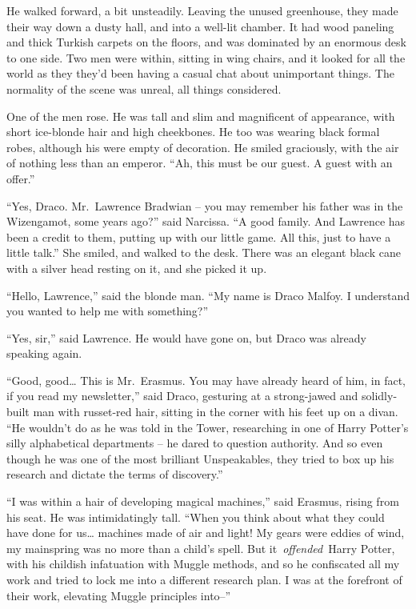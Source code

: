 He walked forward, a bit unsteadily. Leaving the unused greenhouse, they
made their way down a dusty hall, and into a well-lit chamber. It had
wood paneling and thick Turkish carpets on the floors, and was dominated
by an enormous desk to one side. Two men were within, sitting in wing
chairs, and it looked for all the world as they they'd been having a
casual chat about unimportant things. The normality of the scene was
unreal, all things considered.

One of the men rose. He was tall and slim and magnificent of appearance,
with short ice-blonde hair and high cheekbones. He too was wearing black
formal robes, although his were empty of decoration. He smiled
graciously, with the air of nothing less than an emperor. ``Ah, this
must be our guest. A guest with an offer.''

``Yes, Draco. Mr.~Lawrence Bradwian -- you may remember his father was
in the Wizengamot, some years ago?'' said Narcissa. ``A good family. And
Lawrence has been a credit to them, putting up with our little game. All
this, just to have a little talk.'' She smiled, and walked to the desk.
There was an elegant black cane with a silver head resting on it, and
she picked it up.

``Hello, Lawrence,'' said the blonde man. ``My name is Draco Malfoy. I
understand you wanted to help me with something?''

``Yes, sir,'' said Lawrence. He would have gone on, but Draco was
already speaking again.

``Good, good\ldots{} This is Mr.~Erasmus. You may have already heard of
him, in fact, if you read my newsletter,'' said Draco, gesturing at a
strong-jawed and solidly-built man with russet-red hair, sitting in the
corner with his feet up on a divan. ``He wouldn't do as he was told in
the Tower, researching in one of Harry Potter's silly alphabetical
departments -- he dared to question authority. And so even though he was
one of the most brilliant Unspeakables, they tried to box up his
research and dictate the terms of discovery.''

``I was within a hair of developing magical machines,'' said Erasmus,
rising from his seat. He was intimidatingly tall. ``When you think about
what they could have done for us\ldots{} machines made of air and light!
My gears were eddies of wind, my mainspring was no more than a child's
spell. But it~\emph{offended}~Harry Potter, with his childish
infatuation with Muggle methods, and so he confiscated all my work and
tried to lock me into a different research plan. I was at the forefront
of their work, elevating Muggle principles into--''


